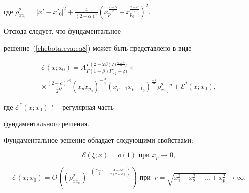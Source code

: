 где $\rho _{xx_0 }^2 = \left| {{x}' - {x}'_0 } \right|^2 +


\frac{4}{\left( {2 - \alpha } \right)^2}\left( {x_p^{\frac{2 -


\alpha }{2}} - x_{p_0 }^{\frac{2 - \alpha }{2}} } \right)^2$.


Отсюда следует,  что фундаментальное


решение~(\ref{chebotareva:eq8}) может быть представлено в виде


\begin{multline}


\label{chebotareva:eq11}


 \mathcal{E}\left( {x; x_0 } \right) = A\frac{\Gamma ( {2 - 2\beta } )\Gamma


\bigl( \frac{\gamma - 2}{2} \bigr)}{\Gamma (1 - \beta )\Gamma \bigl( \frac{\gamma }{2} - \beta 


\bigr)}


\times \\ \times


\frac{\left( {2 - \alpha } \right)^{2\beta }}{2^{4\beta


}}\left( {x_p x_{p_0 } } \right)^{ - \frac{\alpha }{4}}\left(


{x_{p - 1} x_{p - 1_0 } } \right)^{\frac{ - k}{2}}\rho _{xx_o }^{2


- p} +  \mathcal{E}^\ast \left( {x; x_0 } \right), 


\end{multline}


где $\mathcal{E}^\ast \left(x; x_0 \right)$ "--- регулярная часть


фундаментального решения.





Фундаментальное решение обладает следующими свойствами:


\begin{equation}


\label{chebotareva:eq12} \mathcal{E}\left( {\xi;  x} \right) =


o\left( 1 \right)\text{ при } x_{p} \to 0, 


\end{equation}


\begin{equation}


\label{chebotareva:eq15} \mathcal{E}\left( {x; x_0 } \right) =


O\left( {\left( {\rho _{xx_0 }^2 } \right)^{ - \left(


{\frac{\gamma - 2}{2} + \frac{4 - 3\alpha }{2\left( {2 - \alpha }


\right)}} \right)}} \right)\text{ при } ~ r = \sqrt {x_1^2 + x_2^2


+ ... + x_p^2 } \to \infty .


\end{equation}





